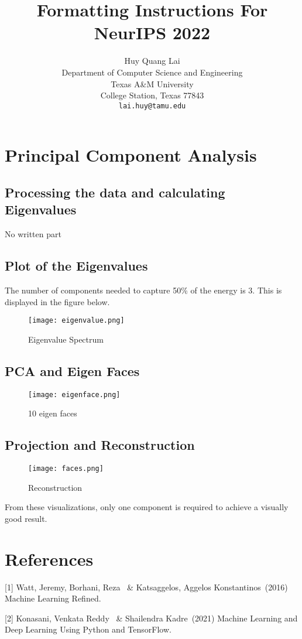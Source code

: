 \documentclass{article}
\title{Formatting Instructions For NeurIPS 2022}
\author{
    Huy Quang Lai \\
    Department of Computer Science and Engineering\\
    Texas A\&M University\\
    College Station, Texas 77843 \\
    \texttt{lai.huy@tamu.edu} \\
}
\begin{document}
\maketitle

\section{Principal Component Analysis}

\subsection{Processing the data and calculating Eigenvalues}
No written part

\subsection{Plot of the Eigenvalues}
The number of components needed to capture 50\% of the energy is $3$. This is displayed in the figure below.
\begin{figure}[!ht]
    \centering
    \texttt{[image: eigenvalue.png]}
    \caption{Eigenvalue Spectrum}
\end{figure}

\clearpage
\subsection{PCA and Eigen Faces}
\begin{figure}[!ht]
    \centering
    \texttt{[image: eigenface.png]}
    \caption{10 eigen faces}
\end{figure}

\subsection{Projection and Reconstruction}
\begin{figure}[!ht]
    \centering
    \texttt{[image: faces.png]}
    \caption{Reconstruction}
\end{figure}

From these visualizations, only one component is required to achieve a visually good result.

\section*{References}
{
\small
[1] Watt, Jeremy, Borhani, Reza \ \& Katsaggelos, Aggelos Konstantinos\ (2016) Machine Learning Refined.

[2] Konasani, Venkata Reddy \ \& Shailendra Kadre\ (2021) Machine Learning and Deep Learning Using Python and TensorFlow.
}
\end{document}
